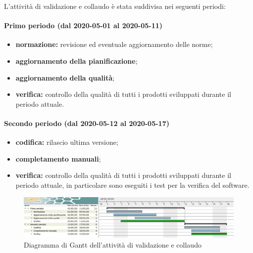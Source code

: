 				L'attività di validazione e collaudo è stata suddivisa nei seguenti periodi:
		
				\paragraph{Primo periodo (dal 2020-05-01 al 2020-05-11)}
			
					\begin{itemize}
						\item \textbf{normazione:} revisione ed eventuale aggiornamento delle norme;
						\item \textbf{aggiornamento della pianificazione};
						\item \textbf{aggiornamento della qualità};
						\item \textbf{verifica:} controllo della qualità di tutti i prodotti sviluppati durante il periodo attuale.
					\end{itemize} 	
				
				\paragraph{Secondo periodo (dal 2020-05-12 al 2020-05-17)}
				
					\begin{itemize}
						\item \textbf{codifica:} rilascio ultima versione;
						\item \textbf{completamento manuali};
						\item \textbf{verifica:} controllo della qualità di tutti i prodotti sviluppati durante il periodo attuale, in particolare sono eseguiti i test per la verifica del software.
					\end{itemize}

			
		\begin{landscape}

          \begin{figure}[H]
            \centering
            \includegraphics[width=\linewidth]{images/gantt/validazioneCollaudo}
            \caption{Diagramma di Gantt dell'attività di validazione e collaudo}
          \end{figure}

		\end{landscape}
